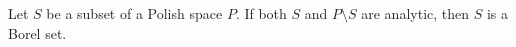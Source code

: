 Let $S$ be a subset of a Polish space $P$. If both $S$ and $P \setminus S$ are analytic, then $S$ is a Borel set.
